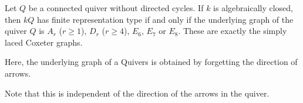 Let $Q$ be a connected quiver without directed cycles. If $k$ is algebraically closed,
then $kQ$ has finite representation type if and only if the underlying graph
of the quiver $Q$ is $A_r$ ($r\geq 1$), $D_r$ ($r\geq 4$), $E_6$, $E_7$ or $E_8$.
These are exactly the simply laced Coxeter graphs.

Here, the underlying graph of a Quivers is obtained by forgetting the direction
of arrows.

Note that this is independent of the direction of the arrows in the quiver.
